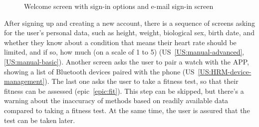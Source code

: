 \begin{figure}[h!]
    \centering
    \hfill
    \caption{Welcome screen with sign-in options and e-mail sign-in screen}
    \label{fig:sign-in-email}
\end{figure}

After signing up and creating a new account, there is a sequence of screens asking for the user's personal data, such as height, weight, biological sex, birth date, and whether they know about a condition that means their heart rate should be limited, and if so, how much (on a scale of 1 to 5) (US~\ref{US:manual-advanced}, \ref{US:manual-basic}).
Another screen asks the user to pair a watch with the APP, showing a list of Bluetooth devices paired with the phone (US~\ref{US:HRM-device-management}).
The last one asks the user to take a fitness test, so that their fitness can be assessed (epic~\ref{epic:fit}).
This step can be skipped, but there's a warning about the inaccuracy of methods based on readily available data compared to taking a fitness test.
At the same time, the user is assured that the test can be taken later.

